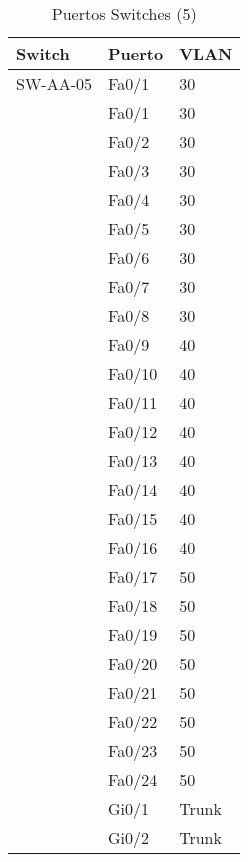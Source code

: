 \documentclass[a4paper,onecolumn,11pt]{article}
\begin{document}
\begin{table}[htbp]
\small \sffamily
\caption{Puertos Switches (5)}
\begin{center}
\begin{tabular}{p{}p{}p{}}
\toprule
\textbf{Switch} & \textbf{Puerto} & \textbf{VLAN}  \\
\toprule
SW-AA-05 & Fa0/1 & 30 \\ %
& Fa0/1 & 30\\
& Fa0/2 & 30\\
& Fa0/3 & 30\\
& Fa0/4 & 30\\
& Fa0/5 & 30\\
& Fa0/6 & 30\\
& Fa0/7 & 30\\
& Fa0/8 & 30\\
& Fa0/9 & 40\\
& Fa0/10 & 40\\
& Fa0/11 & 40\\
& Fa0/12 & 40\\
& Fa0/13 & 40\\
& Fa0/14 & 40\\
& Fa0/15 & 40\\
& Fa0/16 & 40\\
& Fa0/17 & 50\\
& Fa0/18 & 50\\
& Fa0/19 & 50\\
& Fa0/20 & 50\\
& Fa0/21 & 50\\
& Fa0/22 & 50\\
& Fa0/23 & 50\\
& Fa0/24 & 50\\
& Gi0/1 & Trunk  \\
& Gi0/2 & Trunk  \\ 
\bottomrule
\end{tabular}
\end{center}
\label{tab:puertos5}
\end{table}
\end{document}
